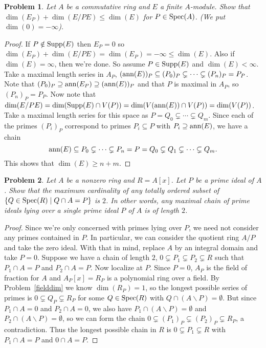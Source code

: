 \documentclass{article}
\newcommand{\ann}{\textup{ann}}
\newcommand{\spec}{\textup{Spec}}
\newcommand{\supp}{\textup{Supp}}
\newtheorem{problem}{Problem}
\begin{document}
\begin{problem}
Let $A$ be a commutative ring and $E$ a finite $A$-module. Show that $\dim(E_P) + \dim(E/PE) \leq \dim(E)$ for $P \in \spec(A)$. (We put $\dim(0) = -\infty$).
\end{problem}
\begin{proof}
If $P \notin \supp(E)$ then $E_P = 0$ so $\dim(E_P) + \dim(E/PE) = \dim(E_P) = - \infty \leq \dim(E)$. Also if $\dim(E) = \infty$, then we're done. So assume $P \in \supp(E)$ and $\dim(E) < \infty$. Take a maximal length series in $A_P$, $(\ann(E))_P \subseteq (P_0)_P \subsetneq \cdots \subsetneq (P_n)_P = P_P$. Note that $(P_0)_P \supseteq \ann(E_P) \supseteq (\ann(E))_P$ and that $P$ is maximal in $A_P$, so $(P_n)_P = P_P$. Now note that $\dim(E/PE) = \dim(\supp(E) \cap V(P)) = \dim(V(\ann(E)) \cap V(P)) = \dim(V(P))$. Take a maximal length series for this space as $P = Q_0 \subsetneq \cdots \subsetneq Q_m$. Since each of the primes $(P_i)_P$ correspond to primes $P_i \subseteq P$ with $P_i \supseteq \ann(E)$, we have a chain
\[
\ann(E) \subseteq P_0 \subsetneq \cdots \subsetneq P_n = P = Q_0 \subsetneq Q_1 \subsetneq \cdots \subsetneq Q_m.
\]
This shows that $\dim(E) \geq n + m$.
\end{proof}

\begin{problem}
\label{sizetwo}
Let $A$ be a nonzero ring and $R = A[x]$. Let $P$ be a prime ideal of $A$. Show that the maximum cardinality of any totally ordered subset of $\{Q \in \spec(R) \mid Q \cap A = P\}$ is $2$. In other words, any maximal chain of prime ideals lying over a single prime ideal $P$ of $A$ is of length $2$.
\end{problem}
\begin{proof}
Since we're only concerned with primes lying over $P$, we need not consider any primes contained in $P$. In particular, we can consider the quotient ring $A/P$ and take the zero ideal. With that in mind, replace $A$ by an integral domain and take $P = 0$. Suppose we have a chain of length $2$, $0 \subsetneq P_1 \subsetneq P_2 \subsetneq R$ such that $P_1 \cap A = P$ and $P_2 \cap A = P$. Now localize at $P$. Since $P = 0$, $A_P$ is the field of fraction for $A$ and $A_P[x] = R_P$ is a polynomial ring over a field. By Problem~\ref{fielddim} we know $\dim(R_P) = 1$, so the longest possible series of primes is $0 \subsetneq Q_P \subsetneq R_P$ for some $Q \in \spec(R)$ with $Q \cap (A \backslash P) = \emptyset$. But since $P_1 \cap A = 0$ and $P_2 \cap A = 0$, we also have $P_1 \cap (A \backslash P) = \emptyset$ and $P_2 \cap (A \backslash P) = \emptyset$, so we can form the chain $0 \subsetneq (P_1)_P \subsetneq (P_2)_P \subsetneq R_P$, a contradiction. Thus the longest possible chain in $R$ is $0 \subsetneq P_1 \subsetneq R$ with $P_1 \cap A = P$ and $0 \cap A = P$.
\end{proof}
\end{document}
